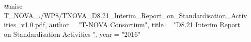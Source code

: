 @misc{ T_NOVA_./WP8/TNOVA_D8.21_Interim_Report_on_Standardisation_Activities_v1.0.pdf,
       author = "{T-NOVA Consortium}",
       title = "D8.21 Interim Report on Standardisation Activities ",
       year = "2016" }
